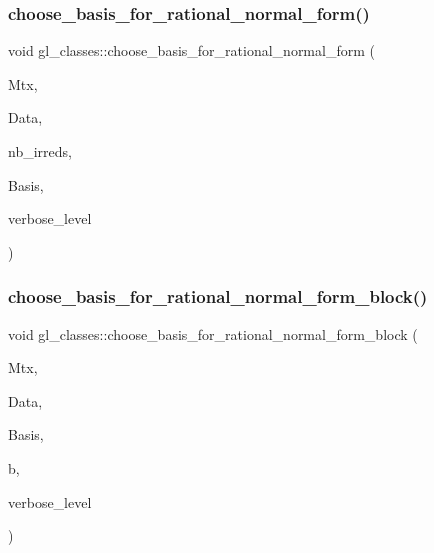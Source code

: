 \subsubsection{\texorpdfstring{choose\+\_\+basis\+\_\+for\+\_\+rational\+\_\+normal\+\_\+form()}{choose\_basis\_for\_rational\_normal\_form()}}
{\footnotesize\ttfamily void gl\+\_\+classes\+::choose\+\_\+basis\+\_\+for\+\_\+rational\+\_\+normal\+\_\+form (\begin{DoxyParamCaption}\item[{\mbox{\hyperlink{galois_8h_a09fddde158a3a20bd2dcadb609de11dc}{I\+NT}} $\ast$}]{Mtx,  }\item[{\mbox{\hyperlink{classmatrix__block__data}{matrix\+\_\+block\+\_\+data}} $\ast$}]{Data,  }\item[{\mbox{\hyperlink{galois_8h_a09fddde158a3a20bd2dcadb609de11dc}{I\+NT}}}]{nb\+\_\+irreds,  }\item[{\mbox{\hyperlink{galois_8h_a09fddde158a3a20bd2dcadb609de11dc}{I\+NT}} $\ast$}]{Basis,  }\item[{\mbox{\hyperlink{galois_8h_a09fddde158a3a20bd2dcadb609de11dc}{I\+NT}}}]{verbose\+\_\+level }\end{DoxyParamCaption})}

\mbox{\label{classgl__classes_acb7c706b045d07bdbdb05b01acc3d105}} 
\subsubsection{\texorpdfstring{choose\+\_\+basis\+\_\+for\+\_\+rational\+\_\+normal\+\_\+form\+\_\+block()}{choose\_basis\_for\_rational\_normal\_form\_block()}}
{\footnotesize\ttfamily void gl\+\_\+classes\+::choose\+\_\+basis\+\_\+for\+\_\+rational\+\_\+normal\+\_\+form\+\_\+block (\begin{DoxyParamCaption}\item[{\mbox{\hyperlink{galois_8h_a09fddde158a3a20bd2dcadb609de11dc}{I\+NT}} $\ast$}]{Mtx,  }\item[{\mbox{\hyperlink{classmatrix__block__data}{matrix\+\_\+block\+\_\+data}} $\ast$}]{Data,  }\item[{\mbox{\hyperlink{galois_8h_a09fddde158a3a20bd2dcadb609de11dc}{I\+NT}} $\ast$}]{Basis,  }\item[{\mbox{\hyperlink{galois_8h_a09fddde158a3a20bd2dcadb609de11dc}{I\+NT}} \&}]{b,  }\item[{\mbox{\hyperlink{galois_8h_a09fddde158a3a20bd2dcadb609de11dc}{I\+NT}}}]{verbose\+\_\+level }\end{DoxyParamCaption})}

